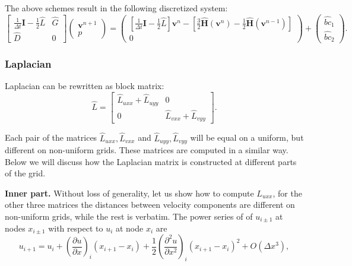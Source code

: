 \documentclass{article}
\begin{document}
The above schemes result in the following discretized system:
\begin{equation}\label{eqn:NSE-dsm-bl-system-schemes}
	\begin{bmatrix}
		\frac{1}{\Delta t}\mathbf{I}-\frac{1}{2}\hat{L} & \hat{G} \\
		\hat{D} & 0
	\end{bmatrix}
	\begin{pmatrix}
		\boldsymbol{v}^{n+1} \\ 
		p
	\end{pmatrix}
	=
	\begin{pmatrix}
		\left[\frac{1}{\Delta t}\mathbf{I}-\frac{1}{2}\hat{L}\right] \boldsymbol{v}^n - \left[\frac{3}{2}\hat{\mathbf{H}}(\boldsymbol{v}^n) - \frac{1}{2}\hat{\mathbf{H}}(\boldsymbol{v}^{n-1})\right]\\
		0
	\end{pmatrix}
	+
	\begin{pmatrix}
		\hat{bc}_1\\
		\hat{bc}_2
	\end{pmatrix}.
\end{equation}



\subsubsection{Laplacian}

Laplacian can be rewritten as block matrix:
\begin{equation}
	\hat L=
	\begin{bmatrix}
  \hat{L}_{uxx}+\hat{L}_{uyy} & 0 \\
  0 & \hat{L}_{vxx}+\hat{L}_{vyy}
\end{bmatrix}.
\end{equation}

Each pair of the matrices $\hat{L}_{uxx},\hat{L}_{vxx}$ and $\hat{L}_{uyy},\hat{L}_{vyy}$ will be equal on a uniform, but different on non-uniform grids. These matrices are computed in a similar way. Below we will discuss how the Laplacian matrix is constructed at different parts of the grid.

\textbf{Inner part.}
Without loss of generality, let us show how to compute $L_{uxx}$, for the other three matrices the distances between velocity components are different on non-uniform grids, while the rest is verbatim. The power series of of $u_{i\pm 1}$ at nodes $x_{i \pm 1}$ with respect to $u_i$ at node $x_i$ are
\begin{equation}\label{eqn:Taylor right} 
	u_{i+1}=u_i+\left(\frac{\partial u}{\partial x}\right)_i\left(x_{i+1}-x_i\right)+\frac{1}{2}\left(\frac{\partial^2 u}{\partial x^2}\right)_i\left(x_{i+1}-x_i\right)^2+O\left(\Delta x^3\right),
\end{equation}
\end{document}
